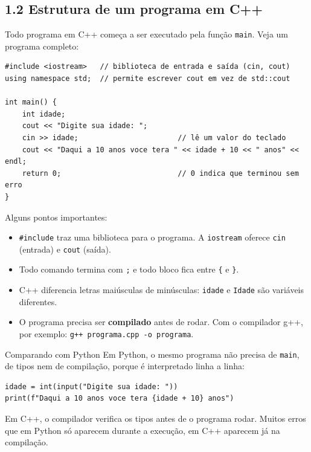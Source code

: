 \subsection{1.2 Estrutura de um programa em C++}

Todo programa em C++ começa a ser executado pela função \texttt{main}. Veja um programa completo:

\begin{codigo}
\begin{Verbatim}[breaklines=true, breaksymbolleft={}, fontsize=\footnotesize]
#include <iostream>   // biblioteca de entrada e saída (cin, cout)
using namespace std;  // permite escrever cout em vez de std::cout

int main() {
    int idade;
    cout << "Digite sua idade: ";
    cin >> idade;                       // lê um valor do teclado
    cout << "Daqui a 10 anos voce tera " << idade + 10 << " anos" << endl;
    return 0;                           // 0 indica que terminou sem erro
}
\end{Verbatim}
\end{codigo}

Alguns pontos importantes:

\begin{itemize}
  \item \texttt{\#include} traz uma biblioteca para o programa. A \texttt{iostream} oferece \texttt{cin} (entrada) e \texttt{cout} (saída).
  \item Todo comando termina com \texttt{;} e todo bloco fica entre \texttt{\{} e \texttt{\}}.
  \item C++ diferencia letras maiúsculas de minúsculas: \texttt{idade} e \texttt{Idade} são variáveis diferentes.
  \item O programa precisa ser \textbf{compilado} antes de rodar. Com o compilador g++, por exemplo: \texttt{g++ programa.cpp -o programa}.
\end{itemize}

\begin{destaque}{Comparando com Python}
Em Python, o mesmo programa não precisa de \texttt{main}, de tipos nem de compilação, porque é interpretado linha a linha:

\begin{codigo}
\begin{Verbatim}[breaklines=true, breaksymbolleft={}, fontsize=\footnotesize]
idade = int(input("Digite sua idade: "))
print(f"Daqui a 10 anos voce tera {idade + 10} anos")
\end{Verbatim}
\end{codigo}

Em C++, o compilador verifica os tipos antes de o programa rodar. Muitos erros que em Python só aparecem durante a execução, em C++ aparecem já na compilação.
\end{destaque}

